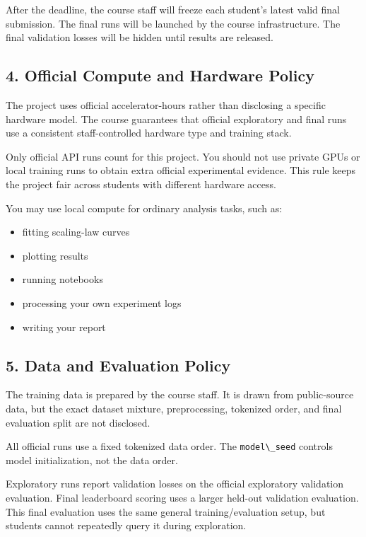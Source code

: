 \documentclass[
  11pt,
]{article}
\newcommand{\passthrough}[1]{#1}
\providecommand{\tightlist}{%
  \setlength{\itemsep}{0pt}\setlength{\parskip}{0pt}}
\begin{document}
After the deadline, the course staff will freeze each student's latest
valid final submission. The final runs will be launched by the course
infrastructure. The final validation losses will be hidden until results
are released.

\hypertarget{official-compute-and-hardware-policy}{%
\subsection{4. Official Compute and Hardware
Policy}\label{official-compute-and-hardware-policy}}

The project uses official accelerator-hours rather than disclosing a
specific hardware model. The course guarantees that official exploratory
and final runs use a consistent staff-controlled hardware type and
training stack.

Only official API runs count for this project. You should not use
private GPUs or local training runs to obtain extra official
experimental evidence. This rule keeps the project fair across students
with different hardware access.

You may use local compute for ordinary analysis tasks, such as:

\begin{itemize}
\tightlist
\item
  fitting scaling-law curves
\item
  plotting results
\item
  running notebooks
\item
  processing your own experiment logs
\item
  writing your report
\end{itemize}

\hypertarget{data-and-evaluation-policy}{%
\subsection{5. Data and Evaluation
Policy}\label{data-and-evaluation-policy}}

The training data is prepared by the course staff. It is drawn from
public-source data, but the exact dataset mixture, preprocessing,
tokenized order, and final evaluation split are not disclosed.

All official runs use a fixed tokenized data order. The
\passthrough{\lstinline!model\_seed!} controls model initialization, not
the data order.

Exploratory runs report validation losses on the official exploratory
validation evaluation. Final leaderboard scoring uses a larger held-out
validation evaluation. This final evaluation uses the same general
training/evaluation setup, but students cannot repeatedly query it
during exploration.
\end{document}
